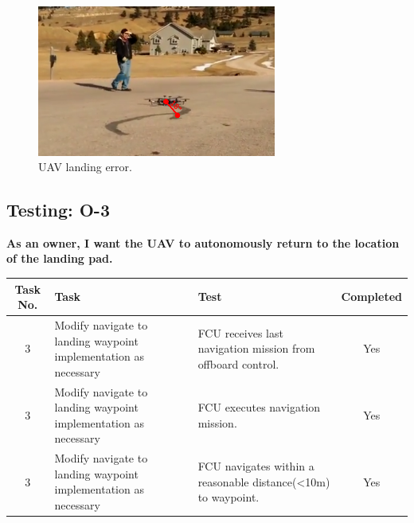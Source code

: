 \begin{figure}[H]
\centering
\includegraphics[width=0.7\textwidth]{images/UAVLanding}
\caption{UAV landing error.}
\end{figure}

\newpage
\subsection{Testing: O-3}
\textbf{As an owner, I want the UAV to autonomously return to the location of the landing pad.}\\
\begin{tabular}{| c | >{\raggedright}m{4cm} | m{4cm} | c |}\hline
	Task No. & Task & Test & Completed\\\hline
	3 & Modify navigate to landing waypoint implementation as necessary & FCU receives last navigation mission from offboard control. & Yes\\\hline
	3 & Modify navigate to landing waypoint implementation as necessary & FCU executes navigation mission. & Yes\\\hline
	3 & Modify navigate to landing waypoint implementation as necessary & FCU navigates within a reasonable distance(\textless 10m) to waypoint. & Yes\\\hline
\end{tabular}

